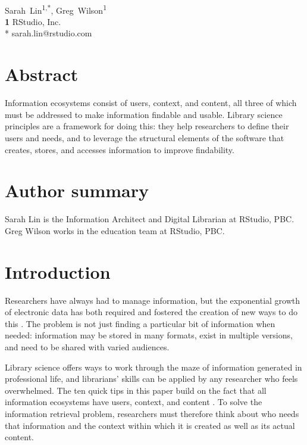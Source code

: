 \documentclass[10pt,letterpaper]{article}
\begin{document}
\vspace*{0.2in}

\begin{flushleft}
{\Large
\textbf{}
}
\newline
\\
{Sarah~Lin}\textsuperscript{1,*},
{Greg~Wilson}\textsuperscript{1}
\\
\textbf{1} RStudio, Inc.
\\
\bigskip
* sarah.lin@rstudio.com
\end{flushleft}

\section*{Abstract}

Information ecosystems consist of users, context, and content, all three of
which must be addressed to make information findable and usable. Library science
principles are a framework for doing this: they help researchers to define their
users and needs, and to leverage the structural elements of the software that
creates, stores, and accesses information to improve findability.

\section*{Author summary}

Sarah Lin is the Information Architect and Digital Librarian at RStudio, PBC.
Greg Wilson works in the education team at RStudio, PBC.

\section*{Introduction}

Researchers have always had to manage information, but the exponential growth of
electronic data has both required and fostered the creation of new ways to do
this \cite{Rosenfeld2015,Hedden2016}. The problem is not just finding a
particular bit of information when needed: information may be stored in many
formats, exist in multiple versions, and need to be shared with varied
audiences.

Library science offers ways to work through the maze of information generated in
professional life, and librarians' skills can be applied by any researcher who
feels overwhelmed. The ten quick tips in this paper build on the fact that all
information ecosystems have users, context, and content \cite{Rosenfeld2015}.
To solve the information retrieval problem, researchers must therefore think
about who needs that information and the context within which it is created as
well as its actual content.
\end{document}
